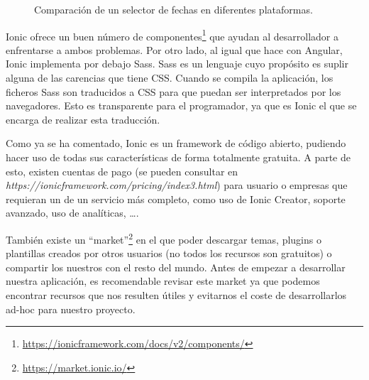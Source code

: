 \begin{figure}[htbp]
\centering
{}\hspace{0.05\textwidth}
{}
\caption{Comparación de un selector de fechas en diferentes plataformas.}
\end{figure}

Ionic ofrece un buen número de componentes\footnote{\url{https://ionicframework.com/docs/v2/components/}} que ayudan al desarrollador a enfrentarse a ambos problemas. Por otro lado, al igual que hace con Angular, Ionic implementa por debajo \gls{Sass}. \gls{Sass} es un lenguaje cuyo propósito es suplir alguna de las carencias que tiene \gls{CSS}. Cuando se compila la aplicación, los ficheros \gls{Sass} son traducidos a \gls{CSS} para que puedan ser interpretados por los navegadores. Esto es transparente para el programador, ya que es Ionic el que se encarga de realizar esta traducción.

Como ya se ha comentado, Ionic es un framework de código abierto, pudiendo hacer uso de todas sus características de forma totalmente gratuita. A parte de esto, existen cuentas de pago (se pueden consultar en \emph{https://ionicframework.com/pricing/index3.html}) para usuario o empresas que requieran un de un servicio más completo, como uso de Ionic Creator, soporte avanzado, uso de analíticas, \ldots.

También existe un ``market''\footnote{\url{https://market.ionic.io/}} en el que poder descargar temas, plugins o plantillas creados por otros usuarios (no todos los recursos son gratuitos) o compartir los nuestros con el resto del mundo. Antes de empezar a desarrollar nuestra aplicación, es recomendable revisar este market ya que podemos encontrar recursos que nos resulten útiles y evitarnos el coste de desarrollarlos ad-hoc para nuestro proyecto.

